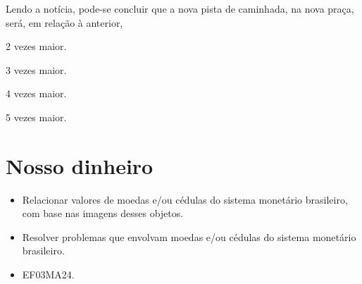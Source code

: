 Lendo a notícia, pode-se concluir que a nova pista de caminhada, na nova praça, será, em relação à anterior,

\begin{escolha}
\item
  2 vezes maior.
\item
  3 vezes maior.
\item
  4 vezes maior.
\item
  5 vezes maior.
\end{escolha}

\chapter{Nosso dinheiro}


\begin{itemize}
\item Relacionar valores de moedas e/ou cédulas do sistema monetário
brasileiro, com base nas imagens desses objetos.

\item Resolver problemas que envolvam moedas e/ou cédulas do sistema
monetário brasileiro.
\end{itemize}


\begin{itemize}
  \item 
 EF03MA24.
\end{itemize}


\pagebreak

